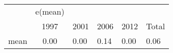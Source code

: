 \begin{tabular}{l*{1}{c}} \toprule
            &     e(mean)&            &            &            &            \\
            &        1997&        2001&        2006&        2012&       Total\\
\midrule
mean        &        0.00&        0.00&        0.14&        0.00&        0.06\\
\bottomrule
\end{tabular}
